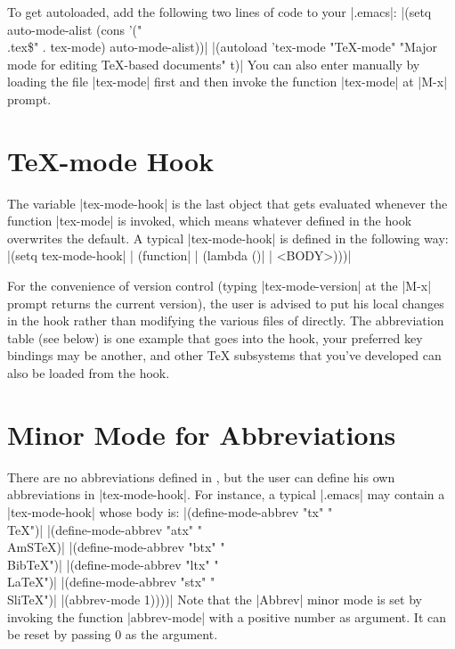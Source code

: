 \noindent
To get {\TM} autoloaded, add the following two lines of code to your
|.emacs|:
\begindisplay
  |(setq auto-mode-alist (cons '("\\.tex\$" . tex-mode) auto-mode-alist))|\cr
  |(autoload 'tex-mode "TeX-mode" "Major mode for editing TeX-based documents" t)|\cr
\enddisplay
You can also enter {\TM} manually by loading the file |tex-mode| first and
then invoke the function |tex-mode| at |M-x| prompt.


\section{{\TeX}-mode Hook}
\noindent
The variable |tex-mode-hook| is the last object that gets evaluated 
whenever the function |tex-mode| is invoked,
which means whatever defined in the hook overwrites the
default.  A typical |tex-mode-hook| is defined in the following way:
\begindisplay
|(setq tex-mode-hook|\cr
|  (function|\cr
|    (lambda ()|\cr
|      <BODY>)))|\cr
\enddisplay

For the convenience of version control (typing |tex-mode-version|
at the |M-x| prompt returns the current {\TM} version),
the user is advised to put his local changes in the hook
rather than modifying the various files of {\TM} directly.
The abbreviation table (see below)
is one example that goes into the hook, your preferred key bindings may be
another, and other {\TeX} subsystems that you've developed can also be loaded
from the hook.


\section{Minor Mode for Abbreviations}
\noindent
There are no abbreviations defined in {\TM},
but the user can define his own abbreviations in |tex-mode-hook|.
For instance, a typical |.emacs| may contain a |tex-mode-hook| whose
body is:
\begindisplay
|(define-mode-abbrev "tx"  "{\\TeX}")|\cr
|(define-mode-abbrev "atx" "{\\AmSTeX})|\cr
|(define-mode-abbrev "btx" "{\\BibTeX}")|\cr
|(define-mode-abbrev "ltx" "{\\LaTeX}")|\cr
|(define-mode-abbrev "stx" "{\\SliTeX}")|\cr
|(abbrev-mode 1))))|\cr
\enddisplay
Note that the |Abbrev| minor mode is set by invoking 
the function |abbrev-mode| with a positive number as argument.
It can be reset by passing $0$ as the argument.

